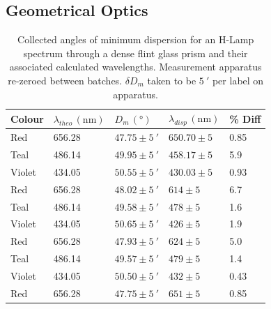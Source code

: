 \documentclass[10pt, twocolumn]{article}
\theoremstyle{definition}
\begin{document}
\subsection{Geometrical Optics}
\begin{table}[ht!]
  \centering%
  \caption{Collected angles of minimum dispersion for an H-Lamp spectrum through a dense flint glass prism and their associated calculated wavelengths.
    Measurement apparatus re-zeroed between batches. $\delta D_m$ taken to be $\qty{5}{\arcminute}$ per label on apparatus.\\}
  \begin{tabular}{lllll}
    \toprule
    Colour & $\lambda_{theo}\, (\unit{\nano\meter})$ & $D_m\, (\unit{\degree})$        & $\lambda_{disp}\, (\unit{\nano\meter})$ & \% Diff \\
    \midrule
    Red    & 656.28                                  & $47.75 \pm \qty{5}{\arcminute}$ & $650.70 \pm 5$                          & 0.85    \\
    Teal   & 486.14                                  & $49.95 \pm \qty{5}{\arcminute}$ & $458.17 \pm 5$                          & 5.9     \\
    Violet & 434.05                                  & $50.55 \pm \qty{5}{\arcminute}$ & $430.03 \pm 5$                          & 0.93    \\
    \midrule
    Red    & 656.28                                  & $48.02 \pm \qty{5}{\arcminute}$ & $614 \pm 5$                          & 6.7     \\
    Teal   & 486.14                                  & $49.58 \pm \qty{5}{\arcminute}$ & $478 \pm 5$                          & 1.6     \\
    Violet & 434.05                                  & $50.65 \pm \qty{5}{\arcminute}$ & $426 \pm 5$                          & 1.9     \\
    \midrule
    Red    & 656.28                                  & $47.93 \pm \qty{5}{\arcminute}$ & $624 \pm 5$                          & 5.0     \\
    Teal   & 486.14                                  & $49.57 \pm \qty{5}{\arcminute}$ & $479 \pm 5$                          & 1.4     \\
    Violet & 434.05                                  & $50.50 \pm \qty{5}{\arcminute}$ & $432 \pm 5$                          & 0.43    \\
    \midrule
    Red    & 656.28                                  & $47.75 \pm \qty{5}{\arcminute}$ & $651 \pm 5$                          & 0.85    \\

\end{tabular}
\end{table}
\end{document}

